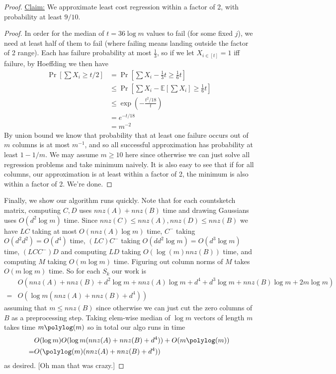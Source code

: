 \documentclass[11pt]{article}
\begin{document}
\begin{proof}
\underline{Claim:} We approximate least cost regression within a factor of 2, with probability at least $9/10$.
\begin{proof}
In order for the median of $t = 36\log m$ values to fail (for some fixed $j$), we need at least half of them to fail (where failing means landing outside the factor of 2 range). Each has failure probability at most $\frac{1}{3}$, so if we let $X_{i \in [t]} = 1$ iff failure, by Hoeffding we then have
\begin{align*}
\Pr[\sum X_i \ge t/2] &= \Pr[\sum X_i - \frac{1}{3}t \ge \frac{1}{6}t]\\
&\le \Pr[\sum X_i - \mathbb{E}[\sum X_i] \ge \frac{1}{6}t]\\
&\le \exp\left(- \frac{t^2/18}{t}\right)\\
&= e^{-t/18}\\
&= m^{-2}
\end{align*}
By union bound we know that probability that at least one failure occurs out of $m$ columns is at most $m^{-1}$, and so all successful approximation has probability at least $1 - 1/m$. We may assume $m \ge 10$ here since otherwise we can just solve all regression problems and take minimum naively. It is also easy to see that if for all columns, our approximation is at least within a factor of 2, the minimum is also within a factor of 2. We're done.
\end{proof}

Finally, we show our algorithm runs quickly. Note that for each countsketch matrix, computing $C,D$ uses $nnz(A) + nnz(B)$ time and drawing Gaussians uses $O(d^2\log m)$ time. Since $nnz(C) \le nnz(A), nnz(D) \le nnz(B)$ we have $LC$ taking at most $O(nnz(A)\log m)$ time, $C^{-}$ taking $O(d^2d^2) = O(d^4)$ time, $(LC)C^-$ taking $O(dd^2\log m) = O(d^3\log m)$ time, $(LCC^-)D$ and computing $LD$ taking $O(\log(m)nnz(B))$ time, and computing $M$ taking $O(m\log m)$ time. Figuring out column norms of $M$ takes $O(m\log m)$ time. So for each $S_k$ our work is
\begin{align*}
    &O(nnz(A) + nnz(B) + d^2\log m + nnz(A)\log m + d^4 + d^3\log m + nnz(B)\log m + 2m\log m)\\
    =& O(\log m(nnz(A) + nnz(B) + d^4))
\end{align*}
assuming that $m \le nnz(B)$ since otherwise we can just cut the zero columns of $B$ as a preprocessing step. Taking elem-wise median of $\log m$ vectors of length $m$ takes time $m \polylog(m)$ so in total our algo runs in time
\begin{align*}
    &O(\log m)O(\log m(nnz(A) + nnz(B) + d^4)) + O(m \polylog(m))\\
    =&O(\polylog(m)(nnz(A) + nnz(B) + d^4))
\end{align*}
as desired. [Oh man that was crazy.]
\end{proof}
\end{document}
